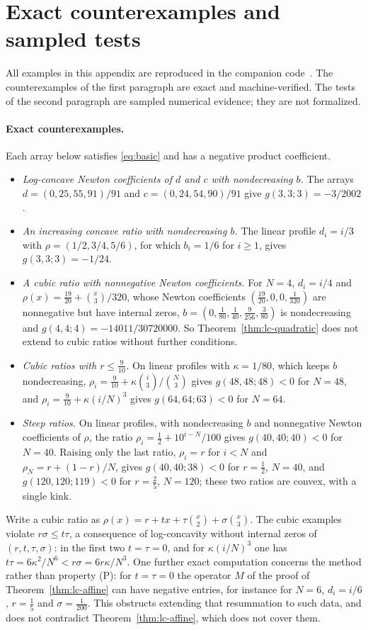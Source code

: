 \appendix
\section{Exact counterexamples and sampled tests}\label{app:frontier}

All examples in this appendix are reproduced in the companion code~\cite{code}. The counterexamples of the first paragraph are exact and machine-verified. The tests of the second paragraph are sampled numerical evidence; they are not formalized.

\paragraph{Exact counterexamples.} Each array below satisfies \eqref{eq:basic} and has a negative product coefficient.
\begin{itemize}
\item \emph{Log-concave Newton coefficients of $d$ and $c$ with nondecreasing $b$.} The arrays $d=(0,25,55,91)/91$ and $c=(0,24,54,90)/91$ give $g(3,3;3)=-3/2002$.
\item \emph{An increasing concave ratio with nondecreasing $b$.} The linear profile $d_i=i/3$ with $\rho=(1/2,3/4,5/6)$, for which $b_i=1/6$ for $i\geq1$, gives $g(3,3;3)=-1/24$.
\item \emph{A cubic ratio with nonnegative Newton coefficients.} For $N=4$, $d_i=i/4$ and $\rho(x)=\frac{19}{20}+\binom x3/320$, whose Newton coefficients $(\frac{19}{20},0,0,\frac1{320})$ are nonnegative but have internal zeros, $b=(0,\frac1{80},\frac1{40},\frac9{256},\frac3{80})$ is nondecreasing and $g(4,4;4)=-14011/30720000$. So Theorem~\ref{thm:lc-quadratic} does not extend to cubic ratios without further conditions.
\item \emph{Cubic ratios with $r\leq\frac9{10}$.} On linear profiles with $\kappa=1/80$, which keeps $b$ nondecreasing, $\rho_i=\frac9{10}+\kappa\binom i3/\binom N3$ gives $g(48,48;48)<0$ for $N=48$, and $\rho_i=\frac9{10}+\kappa(i/N)^3$ gives $g(64,64;63)<0$ for $N=64$.
\item \emph{Steep ratios.} On linear profiles, with nondecreasing $b$ and nonnegative Newton coefficients of $\rho$, the ratio $\rho_i=\frac12+10^{i-N}/100$ gives $g(40,40;40)<0$ for $N=40$. Raising only the last ratio, $\rho_i=r$ for $i<N$ and $\rho_N=r+(1-r)/N$, gives $g(40,40;38)<0$ for $r=\frac12$, $N=40$, and $g(120,120;119)<0$ for $r=\frac25$, $N=120$; these two ratios are convex, with a single kink.
\end{itemize}
Write a cubic ratio as $\rho(x)=r+tx+\tau\binom x2+\sigma\binom x3$. The cubic examples violate $r\sigma\leq t\tau$, a consequence of log-concavity without internal zeros of $(r,t,\tau,\sigma)$: in the first two $t=\tau=0$, and for $\kappa(i/N)^3$ one has $t\tau=6\kappa^2/N^6<r\sigma=6r\kappa/N^3$. One further exact computation concerns the method rather than property (P): for $t=\tau=0$ the operator $M$ of the proof of Theorem~\ref{thm:lc-affine} can have negative entries, for instance for $N=6$, $d_i=i/6$, $r=\frac15$ and $\sigma=\frac1{200}$. This obstructs extending that resummation to such data, and does not contradict Theorem~\ref{thm:lc-affine}, which does not cover them.

